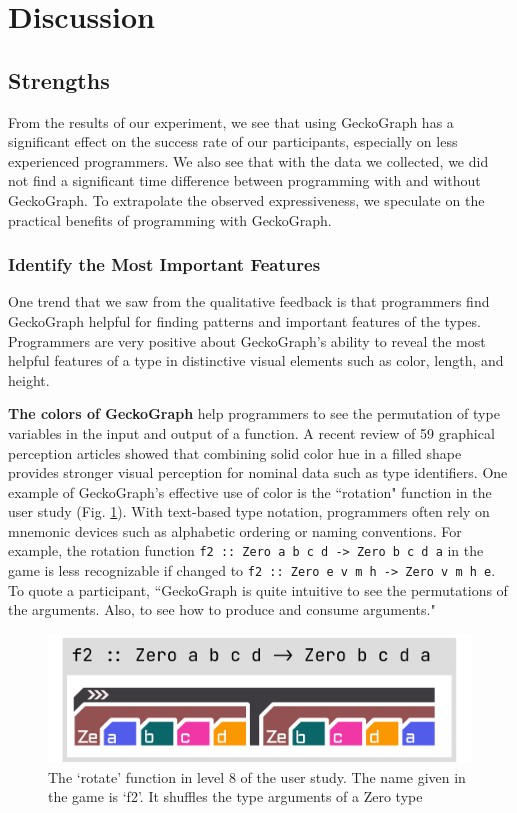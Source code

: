\section{Discussion} \label{sec:discussion}
\subsection{Strengths}
From the results of our experiment, we see that using GeckoGraph has a significant effect on the success rate of our participants, especially on less experienced programmers. We also see that with the data we collected, we did not find a significant time difference between programming with and without GeckoGraph. To extrapolate the observed expressiveness, we speculate on the practical benefits of programming with GeckoGraph.

\subsubsection{Identify the Most Important Features}
One trend that we saw from the qualitative feedback is that programmers find GeckoGraph helpful for finding patterns and important features of the types. Programmers are very positive about GeckoGraph's ability to reveal the most helpful features of a type in distinctive visual elements such as color, length, and height.

\textbf{The colors of GeckoGraph} help programmers to see the permutation of type variables in the input and output of a function. A recent review \cite{Zeng2023-jz} of 59 graphical perception articles showed that combining solid color hue in a filled shape provides stronger visual perception for nominal data such as type identifiers. One example of GeckoGraph's effective use of color is the ``rotation" function in the user study (Fig. \ref{fig:rotate}). With text-based type notation, programmers often rely on mnemonic devices such as alphabetic ordering or naming conventions. For example, the rotation function \texttt{f2 :: Zero a b c d -> Zero b c d a} in the game is less recognizable if changed to \texttt{f2 :: Zero e v m h -> Zero v m h e}. To quote a participant, ``GeckoGraph is quite intuitive to see the permutations of the arguments. Also, to see how to produce and consume arguments." 

\begin{figure}[hbt]
  \includegraphics[width=0.6\linewidth]{figures/rotate}
  \caption[The `rotate' function in level 8 of the user study depicted in GeckoGraph]{\label{fig:rotate} The `rotate' function in level 8 of the user study. The name given in the game is `f2'. It shuffles the type arguments of a Zero type}
\end{figure}


